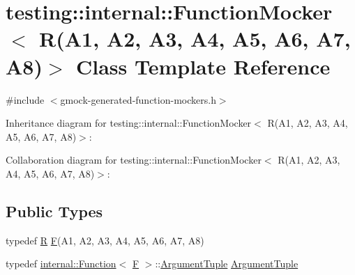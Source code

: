 \hypertarget{classtesting_1_1internal_1_1_function_mocker_3_01_r_07_a1_00_01_a2_00_01_a3_00_01_a4_00_01_a5_00_01_a6_00_01_a7_00_01_a8_08_4}{}\section{testing\+:\+:internal\+:\+:Function\+Mocker$<$ R(A1, A2, A3, A4, A5, A6, A7, A8)$>$ Class Template Reference}
\label{classtesting_1_1internal_1_1_function_mocker_3_01_r_07_a1_00_01_a2_00_01_a3_00_01_a4_00_01_a5_00_01_a6_00_01_a7_00_01_a8_08_4}


{\ttfamily \#include $<$gmock-\/generated-\/function-\/mockers.\+h$>$}



Inheritance diagram for testing\+:\+:internal\+:\+:Function\+Mocker$<$ R(A1, A2, A3, A4, A5, A6, A7, A8)$>$\+:


Collaboration diagram for testing\+:\+:internal\+:\+:Function\+Mocker$<$ R(A1, A2, A3, A4, A5, A6, A7, A8)$>$\+:
\subsection*{Public Types}
\begin{DoxyCompactItemize}
\item 
typedef \hyperlink{typedefs__9_8js_afb423b73ee7b6c04d2d54fc06e405404}{R} \hyperlink{classtesting_1_1internal_1_1_function_mocker_3_01_r_07_a1_00_01_a2_00_01_a3_00_01_a4_00_01_a5_00_01_a6_00_01_a7_00_01_a8_08_4_ad9749c93b0a17540778c5fa162a5fe6c}{F}(A1, A2, A3, A4, A5, A6, A7, A8)
\item 
typedef \hyperlink{structtesting_1_1internal_1_1_function}{internal\+::\+Function}$<$ \hyperlink{classtesting_1_1internal_1_1_function_mocker_3_01_r_07_a1_00_01_a2_00_01_a3_00_01_a4_00_01_a5_00_01_a6_00_01_a7_00_01_a8_08_4_ad9749c93b0a17540778c5fa162a5fe6c}{F} $>$\+::\hyperlink{classtesting_1_1internal_1_1_function_mocker_3_01_r_07_a1_00_01_a2_00_01_a3_00_01_a4_00_01_a5_00_01_a6_00_01_a7_00_01_a8_08_4_a57bc2be00815deac8964e2d2ae62fdd2}{Argument\+Tuple} \hyperlink{classtesting_1_1internal_1_1_function_mocker_3_01_r_07_a1_00_01_a2_00_01_a3_00_01_a4_00_01_a5_00_01_a6_00_01_a7_00_01_a8_08_4_a57bc2be00815deac8964e2d2ae62fdd2}{Argument\+Tuple}
\end{DoxyCompactItemize}
